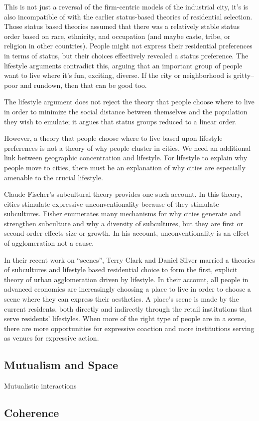This is not just a reversal of the firm-centric models of the
industrial city, it's is also incompatible of with the earlier
status-based theories of residential selection. Those status based
theories assumed that there was a relatively stable status order based
on race, ethnicity, and occupation (and maybe caste, tribe, or
religion in other countries). People might not express their
residential preferences in terms of status, but their choices
effectively revealed a status preference. The lifestyle arguments
contradict this, arguing that an important group of people want to
live where it's fun, exciting, diverse. If the city or neighborhood is
gritty--poor and rundown, then that can be good too.

The lifestyle argument does not reject the theory that people choose
where to live in order to minimize the social distance between
themselves and the population they wish to emulate; it argues that
status groups reduced to a linear order.

However, a theory that people choose where to live based upon
lifestyle preferences is not a theory of why people cluster in
cities. We need an additional link between geographic concentration
and lifestyle. For lifestyle to explain why people move to cities,
there must be an explanation of why cities are especially amenable to
the crucial lifestyle. 


Claude Fischer's subcultural theory provides one such account.
In this theory, cities stimulate expressive unconventionality because
of they stimulate subcultures. Fisher enumerates many mechanisms for
why cities generate and strengthen subculture and why a diversity of
subcultures, but they are first or second order effects size or
growth. In his account, unconventionality is an effect of
agglomeration not a cause.

In their recent work on ``scenes'', Terry Clark and Daniel Silver
married a theories of subcultures and lifestyle based residential
choice to form the first, explicit theory of urban agglomeration
driven by lifestyle. In their account, all people in advanced
economies are increasingly choosing a place to live in order to choose
a scene where they can express their aesthetics. A place's scene is
made by the current residents, both directly and indirectly through
the retail institutions that serve residents' lifestyles. When more of the
right type of people are in a scene, there are more opportunities for
expressive coaction and more institutions serving as venues for
expressive action.

\subsection*{Mutualism and Space}
Mutualistic interactions 

\subsection*{Coherence}




